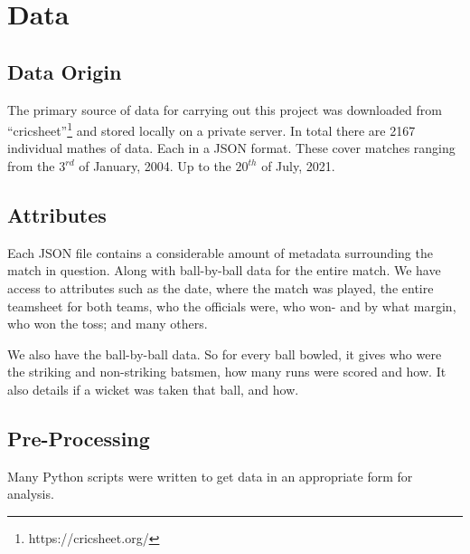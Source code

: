 \chapter{Data}

\section{Data Origin}
The primary source of data for carrying out this project was downloaded from ``cricsheet''\footnote{https://cricsheet.org/}
and stored locally on a private server. In total there are 2167 individual mathes of data. Each in a JSON format.
These cover matches ranging from the $3^{rd}$ of January, 2004. Up to the $20^{th}$ of July, 2021.

\section{Attributes}
Each JSON file contains a considerable amount of metadata surrounding the match in question. Along with 
ball-by-ball data for the entire match. We have access to attributes such as the date, where the match was played,
the entire teamsheet for both teams, who the officials were, who won- and by what margin, who won the toss; and many others.

We also have the ball-by-ball data. So for every ball bowled, it gives who were the striking and non-striking batsmen, how many runs
were scored and how. It also details if a wicket was taken that ball, and how.

\section{Pre-Processing}
Many Python scripts were written to get data in an appropriate form for analysis. 
